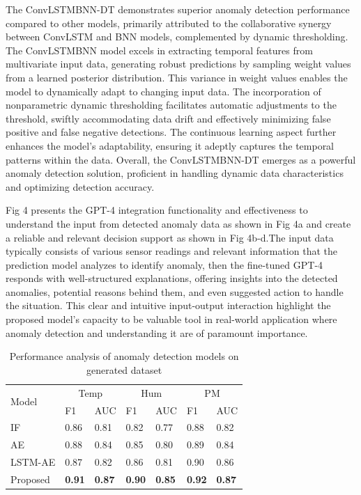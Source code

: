 \documentclass[final,3p,times,twocolumn]{elsarticle}
\begin{document}
The ConvLSTMBNN-DT demonstrates superior anomaly detection performance compared to other models, primarily attributed to the collaborative synergy between ConvLSTM and BNN models, complemented by dynamic thresholding. The ConvLSTMBNN model excels in extracting temporal features from multivariate input data, generating robust predictions by sampling weight values from a learned posterior distribution. This variance in weight values enables the model to dynamically adapt to changing input data. The incorporation of nonparametric dynamic thresholding facilitates automatic adjustments to the threshold, swiftly accommodating data drift and effectively minimizing false positive and false negative detections. The continuous learning aspect further enhances the model's adaptability, ensuring it adeptly captures the temporal patterns within the data. Overall, the ConvLSTMBNN-DT emerges as a powerful anomaly detection solution, proficient in handling dynamic data characteristics and optimizing detection accuracy.

Fig 4 presents the GPT-4 integration functionality and effectiveness to understand the input from detected anomaly data as shown in Fig 4a and create a reliable and relevant decision support as shown in Fig 4b-d.The input data typically consists of various sensor readings and relevant information that the prediction model analyzes to identify anomaly, then the fine-tuned GPT-4 responds with well-structured explanations, offering insights into the detected anomalies, potential reasons behind them, and even suggested action to handle the situation. This clear and intuitive input-output interaction highlight the proposed model's capacity to be valuable tool in real-world application where anomaly detection and understanding it are of paramount importance.

\begin{table}[]
\caption{Performance analysis of anomaly detection models on generated dataset}
\begin{tabular}{lllllll}
\toprule
\multirow{2}{*}{Model} & \multicolumn{2}{c}{Temp} & \multicolumn{2}{c}{Hum}  & \multicolumn{2}{c}{PM} \\ \cline{2-7}
			 &F1                & AUC               & F1              &  AUC            &  F1		&AUC  \\ \hline
IF & 0.86  & 0.81  & 0.82 & 0.77 & 0.88 & 0.82\\
AE      & 0.88 & 0.84 & 0.85 & 0.80 & 0.89  & 0.84\\
LSTM-AE          & 0.87 & 0.82 & 0.86 & 0.81 & 0.90 & 0.86\\ 
Proposed          &\textbf{0.91}& \textbf{0.87} &\textbf{0.90}&\textbf{0.85}&\textbf{0.92}&\textbf{0.87}\\ \hline
\end{tabular}
\end{table}
\end{document}
